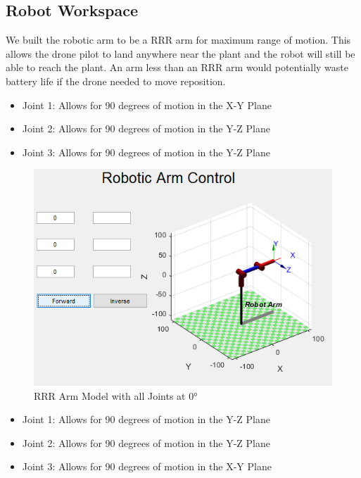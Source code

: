 \subsection{Robot Workspace}
We built the robotic arm to be a RRR arm for maximum range of motion. This allows the drone pilot to land anywhere near the plant and the robot will still be able to reach the plant. An arm less than an RRR arm would potentially waste battery life if the drone needed to move reposition. 
\begin{itemize}
\item Joint 1: Allows for 90 degrees of motion in the X-Y Plane
\item Joint 2: Allows for 90 degrees of motion in the Y-Z Plane
\item Joint 3: Allows for 90 degrees of motion in the Y-Z Plane
\end{itemize}

\begin{figure}
\begin{center}
\includegraphics[width=0.8\columnwidth]{figures/robotarm1.png}
\end{center}
\caption{RRR Arm Model with all Joints at \ang{0}}
\label{fig:robotarm1}
\end{figure}

\begin{itemize}
\item Joint 1: Allows for 90 degrees of motion in the Y-Z Plane
\item Joint 2: Allows for 90 degrees of motion in the Y-Z Plane
\item Joint 3: Allows for 90 degrees of motion in the X-Y Plane
\end{itemize}

